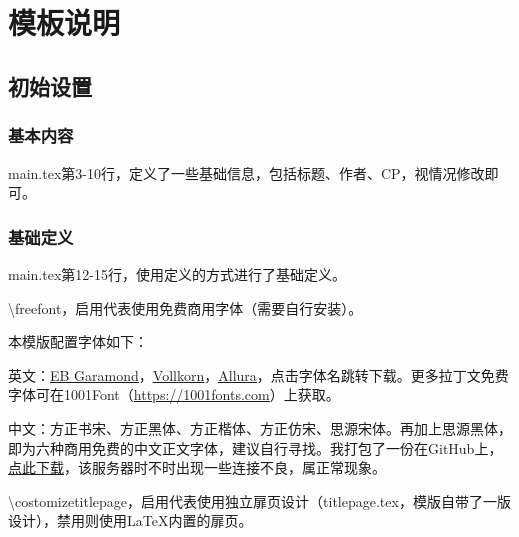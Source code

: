\documentclass[10pt,openany]{book}
\title{\mytitleen\\\mytitle}
\author{\myauthor}
\date{}
\def\costomizetitlepage{} %
\begin{document}
\pagestyle{mystyle}

\ifdefined\costomizetitlepage
    
\else
    \maketitle
\fi

\tocgeo
\tableofcontents
\thispagestyle{empty}

\cleardoublepage
\setcounter{page}{1}
\restoregeometry

\part{模板说明}

\chapter{初始设置}

\section{基本内容}

main.tex第3-10行，定义了一些基础信息，包括标题、作者、CP，视情况修改即可。

\section{基础定义}

main.tex第12-15行，使用定义的方式进行了基础定义。

\textbackslash freefont，启用代表使用免费商用字体（需要自行安装）。

本模版配置字体如下：

英文：\href{https://www.1001fonts.com/eb-garamond-font.html}{\underline{EB Garamond}}，\href{https://www.1001fonts.com/vollkorn-font.html}{\underline{Vollkorn}}，\href{https://www.1001fonts.com/allura-font.html}{\underline{Allura}}，点击字体名跳转下载。更多拉丁文免费字体可在1001Font（\href{https://1001fonts.com}{\underline{https://1001fonts.com}}）上获取。

中文：方正书宋、方正黑体、方正楷体、方正仿宋、思源宋体。再加上思源黑体，即为六种商用免费的中文正文字体，建议自行寻找。我打包了一份在GitHub上，\href{https://github.com/zhuty18/fanfiction-sample/releases/latest/download/fonts.zip}{\underline{点此下载}}，该服务器时不时出现一些连接不良，属正常现象。

\textbackslash costomizetitlepage，启用代表使用独立扉页设计（titlepage.tex，模版自带了一版设计），禁用则使用\LaTeX 内置的扉页。
\end{document}
